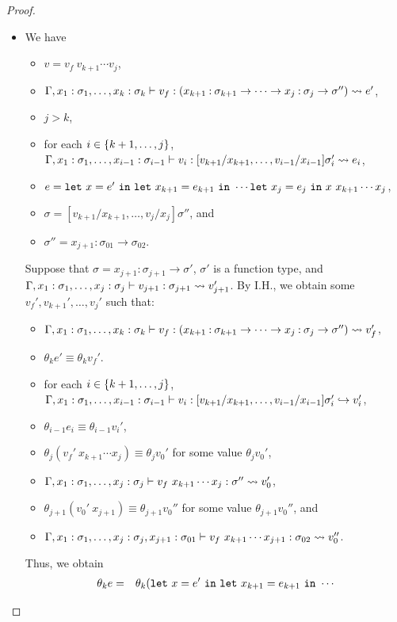 \begin{proof}
\begin{itemize}
\item[] 
We have
\begin{itemize}
\item \(v=v_f\ v_{k+1} \cdots v_j\),
\item \(\Gamma,x_1:\sigma_1,\dots,x_k:\sigma_k \vdash v_f : (x_{k+1}\mathbin{:}\sigma_{k+1} \to \cdots \to x_j\mathbin{:}\sigma_j \to\sigma'') \leadsto e'\),
\item \(j>k\),
\item for each \(i\in\{k+1,\ldots,j\}\), \(\Gamma,x_1:\sigma_1,\dots,x_{i-1}:\sigma_{i-1} \vdash v_i : [v_{k+1}/x_{k+1},\ldots,v_{i-1}/x_{i-1}]\sigma_i' \leadsto e_i\),
\item \(e=\LETEQIN{x}{e'}\LETEQIN{x_{k+1}}{e_{k+1}}\cdots\LETEQIN{x_j}{e_j}x\ x_{k+1} \cdots x_j\),
\item \(\sigma=[v_{k+1}/x_{k+1},\dots,v_j/x_j]\sigma''\), and
\item \(\sigma''=x_{j+1}:\sigma_{01} \to \sigma_{02}\).
\end{itemize}
Suppose that \(\sigma=x_{j+1}:\sigma_{j+1} \to \sigma'\),
\(\sigma'\) is a function type, and
\(\Gamma,x_1:\sigma_1,\dots,x_j:\sigma_j \vdash v_{j+1} : \sigma_{j+1} \leadsto v_{j+1}'\).
%
By I.H., we obtain some \(v_f',v_{k+1}',\dots,v_j'\) such that:
\begin{itemize}
\item \(\Gamma,x_1:\sigma_1,\dots,x_k:\sigma_k \vdash v_f : (x_{k+1}\mathbin{:}\sigma_{k+1} \to \cdots \to x_j\mathbin{:}\sigma_j \to\sigma'') \leadsto v_f'\),
\item \(\theta_k e' \equiv \theta_k v_f'\).
\item for each \(i\in\{k+1,\ldots,j\}\), \(\Gamma,x_1:\sigma_1,\dots,x_{i-1}:\sigma_{i-1} \vdash v_i : [v_{k+1}/x_{k+1},\ldots,v_{i-1}/x_{i-1}]\sigma_i' \hookrightarrow v_i'\),
\item \(\theta_{i-1} e_i \equiv \theta_{i-1} v_i'\),
\item \(\theta_j (v_f'\ x_{k+1} \cdots x_j)\equiv \theta_j v_0'\) for some value \(\theta_j v_0'\),
\item \(\T{\Gamma,x_1:\sigma_1,\dots,x_j:\sigma_j}{v_f\ x_{k+1} \cdots x_j}{\sigma''}{v_0'}\),
\item \(\theta_{j+1} (v_0'\ x_{j+1}) \equiv \theta_{j+1} v_0''\) for some value \(\theta_{j+1} v_0''\), and
\item \(\T{\Gamma,x_1:\sigma_1,\dots,x_j:\sigma_j,x_{j+1}:\sigma_{01}}{v_f\ x_{k+1} \cdots x_{j+1}}{\sigma_{02}}{v_0''}\).
\end{itemize}
Thus, we obtain
\begin{eqnarray*}
\theta_k e
&=&\theta_k (\LETEQIN{x}{e'}\LETEQIN{x_{k+1}}{e_{k+1}}\cdots \\

\end{eqnarray*}
\end{itemize}
\end{proof}
